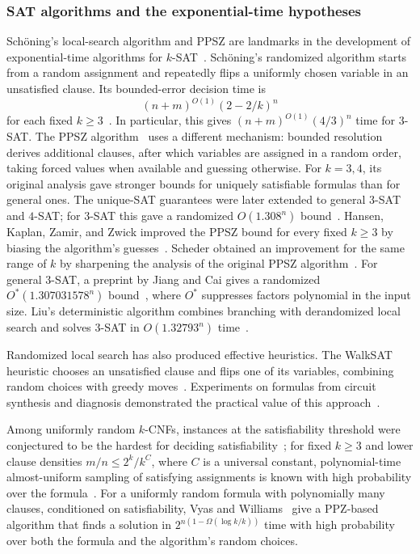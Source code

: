 \documentclass[11pt,reqno]{amsart}
\numberwithin{equation}{section}
\theoremstyle{definition}\newtheorem{definition}[theorem]{Definition}
\theoremstyle{remark}\newtheorem{remark}[theorem]{Remark}
\renewcommand{\le}{\leqslant}
\renewcommand{\ge}{\geqslant}
\begin{document}
\subsubsection{SAT algorithms and the exponential-time hypotheses}\label{subsec:related-sat}
Sch\"oning's local-search algorithm and PPSZ are landmarks in the
development of exponential-time algorithms for $k$-SAT~\cite{Schon99,PPSZ05}.
Sch\"oning's randomized algorithm starts from a random assignment
and repeatedly flips a uniformly chosen variable in an unsatisfied clause. Its
bounded-error decision time is
\[
 (n+m)^{O(1)}(2-2/k)^n
\]
for each fixed $k\ge3$~\cite[Section~2]{Schon99}.
In particular, this gives $(n+m)^{O(1)}(4/3)^n$ time for $3$-SAT.
The PPSZ algorithm~\cite{PPSZ05} uses a different mechanism: bounded resolution derives
additional clauses, after which variables are assigned in a random
order, taking forced values when available and guessing
otherwise. For $k=3,4$, its original analysis gave stronger
bounds for uniquely satisfiable formulas than for general ones.
The unique-SAT guarantees were later extended to general $3$-SAT and
$4$-SAT; for $3$-SAT this gave a randomized
$O(1.308^n)$ bound~\cite{Hertli14}.
Hansen, Kaplan, Zamir, and Zwick improved the PPSZ bound for every
fixed $k\ge3$ by biasing the algorithm's guesses~\cite{HKZZ19}.
Scheder obtained an improvement for the same range of $k$ by sharpening
the analysis of the original PPSZ algorithm~\cite[Theorem~1.5]{Scheder24}.
For general $3$-SAT, a preprint by Jiang and Cai gives a randomized
$O^*(1.307031578^n)$ bound~\cite[Corollary~1.2]{JC26}, where $O^*$
suppresses factors polynomial in the input size. Liu's deterministic
algorithm combines branching with derandomized local search and solves
$3$-SAT in $O(1.32793^n)$ time~\cite[Theorem~21]{Liu18}.

Randomized local search has also produced effective heuristics.
The WalkSAT heuristic chooses an
unsatisfied clause and flips one of its variables, combining random
choices with greedy moves~\cite{SKC94}. Experiments on formulas
from circuit synthesis and diagnosis demonstrated the practical value
of this approach~\cite[pp.~340--342, Tables~4--5]{SKC94}.

Among uniformly random $k$-CNFs, instances at the satisfiability
threshold were conjectured to be the hardest for deciding satisfiability~\cite[Section~1]{VW21};
for fixed $k\ge3$ and lower clause densities $m/n\le 2^k/k^C$,
where $C$ is a universal constant,
polynomial-time almost-uniform sampling of satisfying assignments is
known with high probability over the formula~\cite[Theorem~1.2]{CLWYY25}.
For a uniformly random formula with polynomially many clauses,
conditioned on satisfiability, Vyas and Williams~\cite[Theorem~3]{VW21} give a PPZ-based
algorithm that finds a solution in $2^{n(1-\Omega(\log k/k))}$ time with high
probability over both the formula and the algorithm's random choices.
\end{document}
